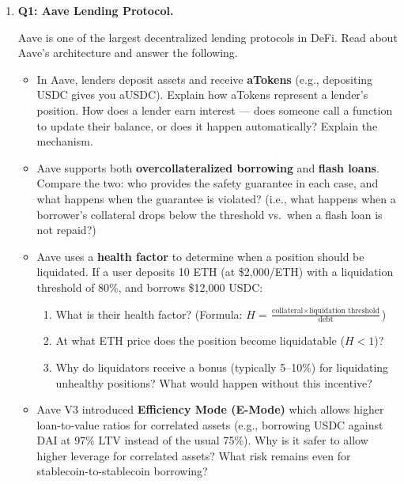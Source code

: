 \documentclass{article}
\begin{document}
\begin{enumerate}

    \item \textbf{Q1: Aave Lending Protocol.}

    Aave is one of the largest decentralized lending protocols in DeFi. Read about Aave's architecture and answer the following.

    \begin{itemize}
        \item[(a)] In Aave, lenders deposit assets and receive \textbf{aTokens} (e.g., depositing USDC gives you aUSDC). Explain how aTokens represent a lender's position. How does a lender earn interest --- does someone call a function to update their balance, or does it happen automatically? Explain the mechanism.
        \item[(b)] Aave supports both \textbf{overcollateralized borrowing} and \textbf{flash loans}. Compare the two: who provides the safety guarantee in each case, and what happens when the guarantee is violated? (i.e., what happens when a borrower's collateral drops below the threshold vs.\ when a flash loan is not repaid?)
        \item[(c)] Aave uses a \textbf{health factor} to determine when a position should be liquidated. If a user deposits 10 ETH (at \$2,000/ETH) with a liquidation threshold of 80\%, and borrows \$12,000 USDC:
        \begin{enumerate}
            \item What is their health factor? (Formula: $H = \frac{\text{collateral} \times \text{liquidation threshold}}{\text{debt}}$)
            \item At what ETH price does the position become liquidatable ($H < 1$)?
            \item Why do liquidators receive a bonus (typically 5--10\%) for liquidating unhealthy positions? What would happen without this incentive?
        \end{enumerate}
        \item[(d)] Aave V3 introduced \textbf{Efficiency Mode (E-Mode)} which allows higher loan-to-value ratios for correlated assets (e.g., borrowing USDC against DAI at 97\% LTV instead of the usual 75\%). Why is it safer to allow higher leverage for correlated assets? What risk remains even for stablecoin-to-stablecoin borrowing?
    \end{itemize}


\end{enumerate}
\end{document}
